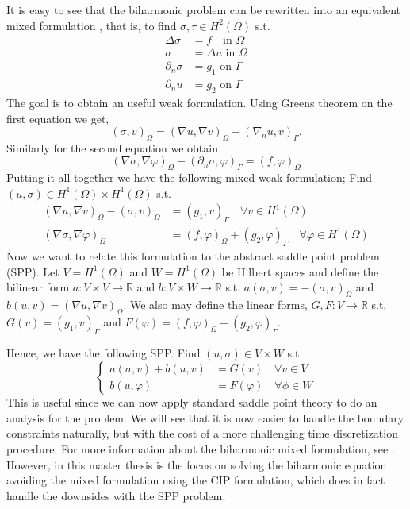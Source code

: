 It is easy to see that the biharmonic problem can be rewritten into an equivalent mixed formulation , that is, to find $\sigma, \tau  \in H^2( \Omega ) $ s.t. \[
    \begin{split}
\Delta \sigma  & = f \quad  \text{in } \Omega \\
\sigma   & = \Delta u  \text{ in } \Omega \\
\partial _{n} \sigma  & = g_{1} \text{ on } \Gamma  \\
\partial _{n} u   & = g_{2} \text{ on } \Gamma
    \end{split}
\]
The goal is to obtain an useful weak formulation. Using Greens theorem on the first equation we get,
\[
( \sigma, v)_{\Omega } = ( \nabla  u , \nabla v  )_{\Omega } - ( \nabla _{n} u , v) _{\Gamma }.
\]
Similarly for the second equation we obtain
\[
( \nabla \sigma , \nabla \varphi  )_{\Omega} - ( \partial _{n} \sigma ,  \varphi )_{\Gamma } = ( f,\varphi ) _{\Omega}
\]
Putting it all together we have the following mixed weak formulation; Find $( u, \sigma ) \in H^{1}( \Omega ) \times H^{1}( \Omega )  $ s.t. \[
    \begin{split}
     ( \nabla  u , \nabla v  )_{\Omega } -( \sigma, v)_{\Omega }  & =   ( g_{1} , v) _{\Gamma } \quad  \forall v \in H^{1}( \Omega ) \\
( \nabla \sigma , \nabla \varphi  )_{\Omega}  & = ( f,\varphi ) _{\Omega} + ( g_{2} ,  \varphi )_{\Gamma } \quad  \forall \varphi \in H^{1}( \Omega )
    \end{split}
\]
Now we want to relate this formulation to the abstract saddle point problem (SPP).
Let $V = H^{1}( \Omega ) $  and $W=H^{1}( \Omega ) $ be  Hilbert spaces and define the bilinear form $a: V\times V \to \mathbb{R}  $ and $b: V \times W \to \mathbb{R} $ s.t. $a( \sigma,v ) = - ( \sigma , v) _{\Omega }  $ and $b( u,v) = ( \nabla u,
\nabla v)_{\Omega  }  $. We also may define the linear forms, $G,F: V \to \mathbb{R} $ s.t. $ G( v)  = ( g_{1}, v) _{\Gamma } $ and $F( \varphi ) = ( f, \varphi )_{\Omega } + ( g_{2}, \varphi )_{\Gamma } $.

Hence, we have the following SPP. Find $( u,\sigma ) \in V \times W$ s.t.  \[
    \begin{cases}
       a( \sigma ,v) + b ( u, v )  & = G( v)   \quad  \forall v \in V \\
       b( u, \varphi  )  & = F( \varphi )     \quad \forall \phi \in W
    \end{cases}
\]
This is useful since we can now apply standard saddle point theory to do an analysis for the problem. We will see that it is now easier to handle the boundary constraints naturally, but with the cost of a more challenging time discretization
procedure.
For more information about the biharmonic mixed formulation, see \cite{babuvska1980analysis,cai2023nitsche}.
However, in this master thesis is the focus on solving the biharmonic equation avoiding the mixed formulation using the CIP formulation, which does in fact handle the downsides with the SPP problem.





